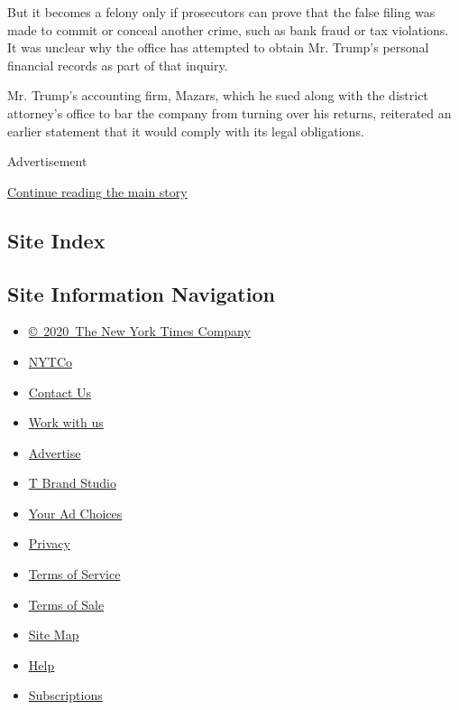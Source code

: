 But it becomes a felony only if prosecutors can prove that the false
filing was made to commit or conceal another crime, such as bank fraud
or tax violations. It was unclear why the office has attempted to obtain
Mr. Trump's personal financial records as part of that inquiry.

Mr. Trump's accounting firm, Mazars, which he sued along with the
district attorney's office to bar the company from turning over his
returns, reiterated an earlier statement that it would comply with its
legal obligations.

Advertisement

\protect\hyperlink{after-bottom}{Continue reading the main story}

\hypertarget{site-index}{%
\subsection{Site Index}\label{site-index}}

\hypertarget{site-information-navigation}{%
\subsection{Site Information
Navigation}\label{site-information-navigation}}

\begin{itemize}
\tightlist
\item
  \href{https://help.nytimes.com/hc/en-us/articles/115014792127-Copyright-notice}{©~2020~The
  New York Times Company}
\end{itemize}

\begin{itemize}
\tightlist
\item
  \href{https://www.nytco.com/}{NYTCo}
\item
  \href{https://help.nytimes.com/hc/en-us/articles/115015385887-Contact-Us}{Contact
  Us}
\item
  \href{https://www.nytco.com/careers/}{Work with us}
\item
  \href{https://nytmediakit.com/}{Advertise}
\item
  \href{http://www.tbrandstudio.com/}{T Brand Studio}
\item
  \href{https://www.nytimes.com/privacy/cookie-policy\#how-do-i-manage-trackers}{Your
  Ad Choices}
\item
  \href{https://www.nytimes.com/privacy}{Privacy}
\item
  \href{https://help.nytimes.com/hc/en-us/articles/115014893428-Terms-of-service}{Terms
  of Service}
\item
  \href{https://help.nytimes.com/hc/en-us/articles/115014893968-Terms-of-sale}{Terms
  of Sale}
\item
  \href{https://spiderbites.nytimes.com}{Site Map}
\item
  \href{https://help.nytimes.com/hc/en-us}{Help}
\item
  \href{https://www.nytimes.com/subscription?campaignId=37WXW}{Subscriptions}
\end{itemize}
